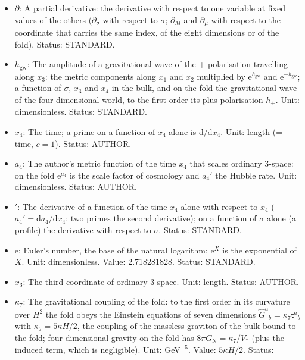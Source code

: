 \documentclass[
  10pt,
]{article}
\providecommand{\tightlist}{%
  \setlength{\itemsep}{0pt}\setlength{\parskip}{0pt}}
\begin{document}
\begin{itemize}
\tightlist
\item
  \(\partial\): A partial derivative: the derivative with respect to one
  variable at fixed values of the others (\(\partial_\sigma\) with
  respect to \(\sigma\); \(\partial_M\) and \(\partial_\mu\) with
  respect to the coordinate that carries the same index, of the eight
  dimensions or of the fold). Status: STANDARD.
\item
  \(h_{\mathrm{gw}}\): The amplitude of a gravitational wave of the +
  polarisation travelling along \(x_3\): the metric components along
  \(x_1\) and \(x_2\) multiplied by \(\mathrm{e}^{h_{\mathrm{gw}}}\) and
  \(\mathrm{e}^{-h_{\mathrm{gw}}}\); a function of \(\sigma\), \(x_3\)
  and \(x_4\) in the bulk, and on the fold the gravitational wave of the
  four-dimensional world, to the first order its plus polarisation
  \(h_{+}\). Unit: dimensionless. Status: STANDARD.
\item
  \(x_4\): The time; a prime on a function of \(x_4\) alone is
  \(\mathrm{d}/\mathrm{d}x_4\). Unit: length (= time, \(c = 1\)).
  Status: AUTHOR.
\item
  \(a_4\): The author's metric function of the time \(x_4\) that scales
  ordinary 3-space: on the fold \(\mathrm{e}^{a_4}\) is the scale factor
  of cosmology and \(a_4'\) the Hubble rate. Unit: dimensionless.
  Status: AUTHOR.
\item
  \({}'\): The derivative of a function of the time \(x_4\) alone with
  respect to \(x_4\) (\(a_4' = \mathrm{d}a_4/\mathrm{d}x_4\); two primes
  the second derivative); on a function of \(\sigma\) alone (a profile)
  the derivative with respect to \(\sigma\). Status: STANDARD.
\item
  \(\mathrm{e}\): Euler's number, the base of the natural logarithm;
  \(\mathrm{e}^{X}\) is the exponential of \(X\). Unit: dimensionless.
  Value: 2.718281828. Status: STANDARD.
\item
  \(x_3\): The third coordinate of ordinary 3-space. Unit: length.
  Status: AUTHOR.
\item
  \(\kappa_7\): The gravitational coupling of the fold: to the first
  order in its curvature over \(H^2\) the fold obeys the Einstein
  equations of seven dimensions
  \(\hat G^a{}_b = \kappa_7\mathsf{t}^a{}_b\) with
  \(\kappa_7 = 5\kappa H/2\), the coupling of the massless graviton of
  the bulk bound to the fold; four-dimensional gravity on the fold has
  \(8\pi G_{\mathrm{N}} = \kappa_7/V_*\) (plus the induced term, which
  is negligible). Unit: GeV\(^{-5}\). Value: \(5\kappa H/2\). Status:

\end{itemize}
\end{document}
